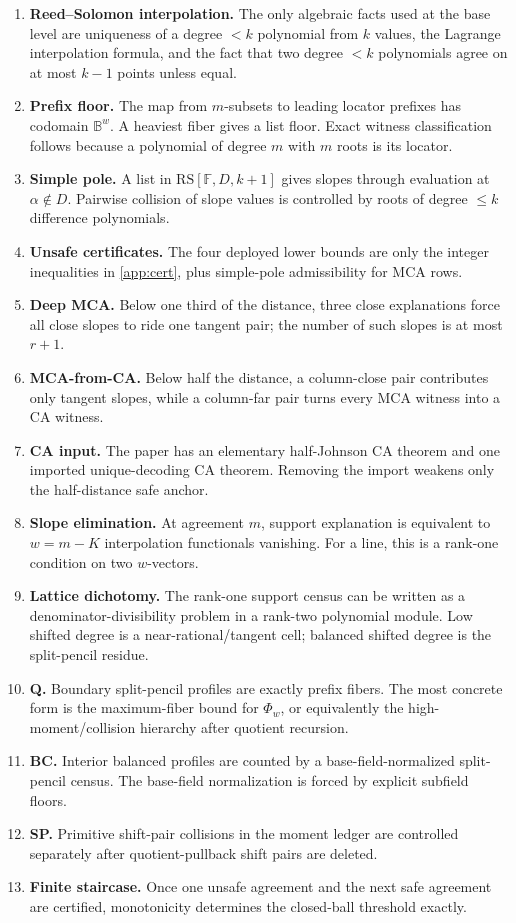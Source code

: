 \documentclass[11pt]{article}
\theoremstyle{definition}
\theoremstyle{remark}
\newcommand{\F}{\mathbb F}
\newcommand{\BB}{\mathbb B}
\newcommand{\RS}{\mathrm{RS}}
\begin{document}
\begin{enumerate}[leftmargin=2em,label=\textbf{D\arabic*.}]
\item \textbf{Reed--Solomon interpolation.}  The only algebraic facts used at the base level are uniqueness of a degree \(<k\) polynomial from \(k\) values, the Lagrange interpolation formula, and the fact that two degree \(<k\) polynomials agree on at most \(k-1\) points unless equal.
\item \textbf{Prefix floor.}  The map from \(m\)-subsets to leading locator prefixes has codomain \(\BB^w\).  A heaviest fiber gives a list floor.  Exact witness classification follows because a polynomial of degree \(m\) with \(m\) roots is its locator.
\item \textbf{Simple pole.}  A list in \(\RS[\F,D,k+1]\) gives slopes through evaluation at \(\alpha\notin D\).  Pairwise collision of slope values is controlled by roots of degree \(\le k\) difference polynomials.
\item \textbf{Unsafe certificates.}  The four deployed lower bounds are only the integer inequalities in \cref{app:cert}, plus simple-pole admissibility for MCA rows.
\item \textbf{Deep MCA.}  Below one third of the distance, three close explanations force all close slopes to ride one tangent pair; the number of such slopes is at most \(r+1\).
\item \textbf{MCA-from-CA.}  Below half the distance, a column-close pair contributes only tangent slopes, while a column-far pair turns every MCA witness into a CA witness.
\item \textbf{CA input.}  The paper has an elementary half-Johnson CA theorem and one imported unique-decoding CA theorem.  Removing the import weakens only the half-distance safe anchor.
\item \textbf{Slope elimination.}  At agreement \(m\), support explanation is equivalent to \(w=m-K\) interpolation functionals vanishing.  For a line, this is a rank-one condition on two \(w\)-vectors.
\item \textbf{Lattice dichotomy.}  The rank-one support census can be written as a denominator-divisibility problem in a rank-two polynomial module.  Low shifted degree is a near-rational/tangent cell; balanced shifted degree is the split-pencil residue.
\item \textbf{Q.}  Boundary split-pencil profiles are exactly prefix fibers.  The most concrete form is the maximum-fiber bound for \(\Phi_w\), or equivalently the high-moment/collision hierarchy after quotient recursion.
\item \textbf{BC.}  Interior balanced profiles are counted by a base-field-normalized split-pencil census.  The base-field normalization is forced by explicit subfield floors.
\item \textbf{SP.}  Primitive shift-pair collisions in the moment ledger are controlled separately after quotient-pullback shift pairs are deleted.
\item \textbf{Finite staircase.}  Once one unsafe agreement and the next safe agreement are certified, monotonicity determines the closed-ball threshold exactly.
\end{enumerate}
\end{document}
